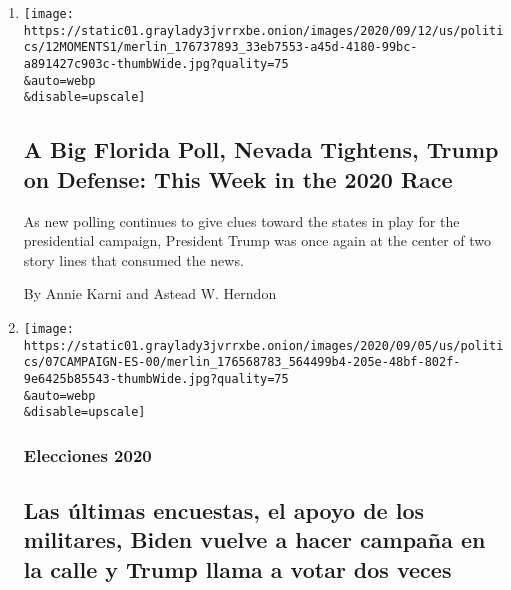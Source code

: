 \begin{enumerate}
\def\labelenumi{\arabic{enumi}.}
\item
  \href{/2020/09/12/us/politics/trump-scandals-woodward-midwest.html}{}

  \texttt{[image: https://static01.graylady3jvrrxbe.onion/images/2020/09/12/us/politics/12MOMENTS1/merlin\_176737893\_33eb7553-a45d-4180-99bc-a891427c903c-thumbWide.jpg?quality=75\\\&auto=webp\\\&disable=upscale]}

  \hypertarget{a-big-florida-poll-nevada-tightens-trump-on-defense-this-week-in-the-2020-race}{%
  \subsection{A Big Florida Poll, Nevada Tightens, Trump on Defense:
  This Week in the 2020
  Race}\label{a-big-florida-poll-nevada-tightens-trump-on-defense-this-week-in-the-2020-race}}

  As new polling continues to give clues toward the states in play for
  the presidential campaign, President Trump was once again at the
  center of two story lines that consumed the news.

  By Annie Karni and Astead W. Herndon
\item
  \href{/es/2020/09/07/espanol/estados-unidos/trump-biden-encuestas-elecciones.html}{}

  \texttt{[image: https://static01.graylady3jvrrxbe.onion/images/2020/09/05/us/politics/07CAMPAIGN-ES-00/merlin\_176568783\_564499b4-205e-48bf-802f-9e6425b85543-thumbWide.jpg?quality=75\\\&auto=webp\\\&disable=upscale]}

  \hypertarget{elecciones-2020}{%
  \subsubsection{Elecciones 2020}\label{elecciones-2020}}

  \hypertarget{las-uxfaltimas-encuestas-el-apoyo-de-los-militares-biden-vuelve-a-hacer-campauxf1a-en-la-calle-y-trump-llama-a-votar-dos-veces}{%
  \subsection{Las últimas encuestas, el apoyo de los militares, Biden
  vuelve a hacer campaña en la calle y Trump llama a votar dos
  veces}\label{las-uxfaltimas-encuestas-el-apoyo-de-los-militares-biden-vuelve-a-hacer-campauxf1a-en-la-calle-y-trump-llama-a-votar-dos-veces}}


\end{enumerate}
